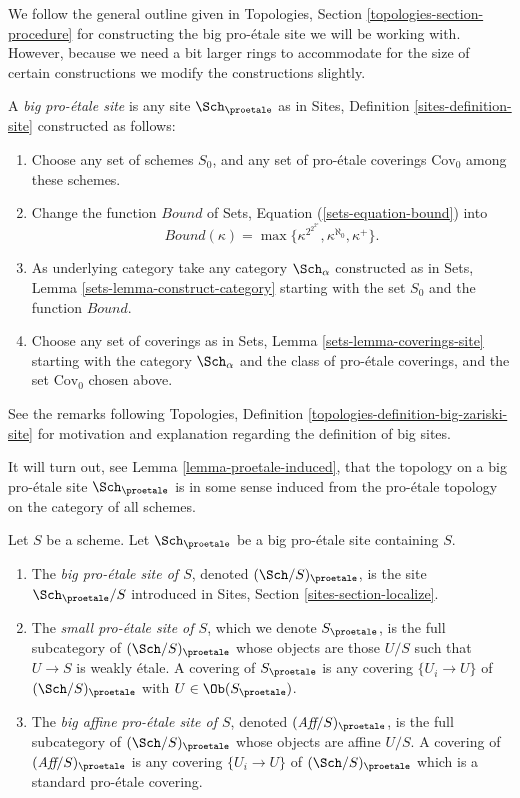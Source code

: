 \noindent
We follow the general outline given in
Topologies, Section \ref{topologies-section-procedure}
for constructing the big pro-\'etale site we will be working with.
However, because we need a bit larger rings to accommodate for the size
of certain constructions we modify the constructions slightly.

\begin{definition}
\label{definition-big-proetale-site}
A {\it big pro-\'etale site} is any site $\Sch_\proetale$ as in
Sites, Definition \ref{sites-definition-site} constructed as follows:
\begin{enumerate}
\item Choose any set of schemes $S_0$, and any set of pro-\'etale coverings
$\text{Cov}_0$ among these schemes.
\item Change the function $Bound$ of
Sets, Equation (\ref{sets-equation-bound}) into
$$
Bound(\kappa) = \max\{\kappa^{2^{2^{2^\kappa}}}, \kappa^{\aleph_0}, \kappa^+\}.
$$
\item As underlying category take any category $\Sch_\alpha$
constructed as in Sets, Lemma \ref{sets-lemma-construct-category}
starting with the set $S_0$ and the function $Bound$.
\item Choose any set of coverings as in
Sets, Lemma \ref{sets-lemma-coverings-site} starting with the
category $\Sch_\alpha$ and the class of pro-\'etale coverings,
and the set $\text{Cov}_0$ chosen above.
\end{enumerate}
\end{definition}

\noindent
See the remarks following
Topologies, Definition \ref{topologies-definition-big-zariski-site}
for motivation and explanation regarding the definition of big sites.

\medskip\noindent
It will turn out, see Lemma \ref{lemma-proetale-induced}, that the
topology on a big pro-\'etale site $\Sch_\proetale$ is in some sense
induced from the pro-\'etale topology on the category of all schemes.

\begin{definition}
\label{definition-big-small-proetale}
Let $S$ be a scheme. Let $\Sch_\proetale$ be a big pro-\'etale
site containing $S$.
\begin{enumerate}
\item The {\it big pro-\'etale site of $S$}, denoted
$(\Sch/S)_\proetale$, is the site $\Sch_\proetale/S$
introduced in Sites, Section \ref{sites-section-localize}.
\item The {\it small pro-\'etale site of $S$}, which we denote
$S_\proetale$, is the full subcategory of $(\Sch/S)_\proetale$
whose objects are those $U/S$ such that $U \to S$ is weakly \'etale.
A covering of $S_\proetale$ is any covering $\{U_i \to U\}$ of
$(\Sch/S)_\proetale$ with $U \in \Ob(S_\proetale)$.
\item The {\it big affine pro-\'etale site of $S$}, denoted
$(\textit{Aff}/S)_\proetale$, is the full subcategory of
$(\Sch/S)_\proetale$ whose objects are affine $U/S$.
A covering of $(\textit{Aff}/S)_\proetale$ is any covering
$\{U_i \to U\}$ of $(\Sch/S)_\proetale$ which is a
standard pro-\'etale covering.
\end{enumerate}
\end{definition}

